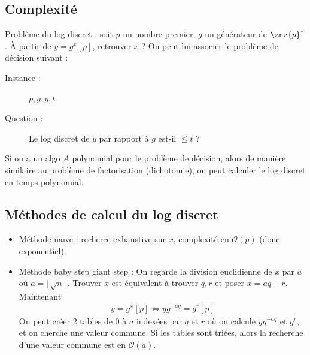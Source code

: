         \subsection{Complexité}
            Problème du log discret : soit $p$ un nombre premier, $g$ un générateur de $\znz{p}^*$. À partir de $y = g^x [p]$, retrouver $x$ ? On peut lui associer le problème de décision suivant :
            \begin{description}
                \item[Instance :] $p, g, y, t$
                \item[Question :] Le log discret de $y$ par rapport à $g$ est-il $\leq t$ ? 
            \end{description}
            Si on a un algo $A$ polynomial pour le problème de décision, alors de manière similaire au problème de factorisation (dichotomie), on peut calculer le log discret en temps polynomial.

        \subsection{Méthodes de calcul du log discret}
            \begin{itemize}
                \item Méthode naïve : recherce exhaustive sur $x$, complexité en $\mathcal{O}(p)$ (donc exponentiel).
                \item Méthode baby step giant step : On regarde la division euclidienne de $x$ par $a$ où $a = \lfloor \sqrt{n} \rfloor$. Trouver $x$ est équivalent à trouver $q, r$ et poser $x = aq + r$. Maintenant 
                \begin{align*}
                    y = g^x [p] \iff yg^{-aq} = g^r[p]
                \end{align*}
                On peut créer 2 tables de $0$ à $a$ indexées par $q$ et $r$ où on calcule $yg^{-aq}$ et $g^r$, et on cherche une valeur commune. Si les tables sont triées, alors la recherche d'une valeur commune est en $\mathcal{O}(a)$. 
            \end{itemize}
            
